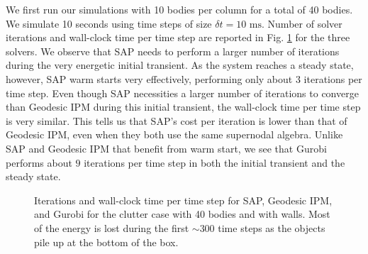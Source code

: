 We first run our simulations with 10 bodies per column for a total of 40 bodies.
We simulate 10 seconds using time steps of size $\delta t = 10\text{ ms}$.
Number of solver iterations and wall-clock time per time step are reported in
Fig. \ref{fig:clutter_w_walls_nb40} for the three solvers. We observe that SAP
needs to perform a larger number of iterations during the very energetic initial
transient. As the system reaches a steady state, however, SAP warm starts very
effectively, performing only about $3$ iterations per time step. Even though
SAP necessities a larger number of iterations to converge than Geodesic IPM during this initial transient, the wall-clock time per time step is very
similar. This tells us that SAP's cost per iteration is lower than that of
Geodesic IPM, even when they both use the same supernodal algebra. Unlike SAP and Geodesic IPM that benefit from warm start, we see that Gurobi performs
about $9$ iterations per time step in both the initial transient and the steady state.
\begin{figure}[!h]
	\centering
	\caption{\label{fig:clutter_w_walls_nb40} 
	Iterations and wall-clock time per time step for SAP, Geodesic IPM, and
	Gurobi for the clutter case with 40 bodies and with walls. Most of the
	energy is lost during the first $\sim300$ time steps as the objects pile up
	at the bottom of the box.}
\end{figure}

